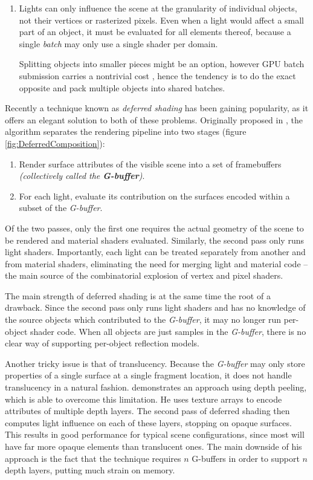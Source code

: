 \begin{enumerate}
\item Lights can only influence the scene at the granularity of individual objects, not their vertices or rasterized pixels. Even when a light would affect a small part of an object, it must be evaluated for all elements thereof, because a single \emph{batch} may only use a single shader per domain.

Splitting objects into smaller pieces might be an option, however GPU batch submission carries a nontrivial cost \cite{BatchBatchBatch}, hence the tendency is to do the exact opposite and pack multiple objects into shared batches.
\end{enumerate}

Recently a technique known as \emph{deferred shading} has been gaining popularity, as it offers an elegant solution to both of these problems. Originally proposed in \citet{DeeringDeferred}, the algorithm separates the rendering pipeline into two stages (figure \ref{fig:DeferredComposition}):

\begin{enumerate}
\item Render surface attributes of the visible scene into a set of framebuffers \emph{(collectively called the \textbf{G-buffer})}.
\item For each light, evaluate its contribution on the surfaces encoded within a subset of the \emph{G-buffer}.
\end{enumerate}

Of the two passes, only the first one requires the actual geometry of the scene to be rendered and material shaders evaluated. Similarly, the second pass only runs light shaders. Importantly, each light can be treated separately from another and from material shaders, eliminating the need for merging light and material code -- the main source of the combinatorial explosion of vertex and pixel shaders.

The main strength of deferred shading is at the same time the root of a drawback. Since the second pass only runs light shaders and has no knowledge of the source objects which contributed to the \emph{G-buffer}, it may no longer run per-object shader code. When all objects are just samples in the \emph{G-buffer}, there is no clear way of supporting per-object reflection models.

Another tricky issue is that of translucency. Because the \emph{G-buffer} may only store properties of a single surface at a single fragment location, it does not handle translucency in a natural fashion. \citet{HumusDeepDeferred} demonstrates an approach using depth peeling, which is able to overcome this limitation. He uses texture arrays to encode attributes of multiple depth layers. The second pass of deferred shading then computes light influence on each of these layers, stopping on opaque surfaces. This results in good performance for typical scene configurations, since most will have far more opaque elements than translucent ones. The main downside of his approach is the fact that the technique requires $n$ G-buffers in order to support $n$ depth layers, putting much strain on memory.

